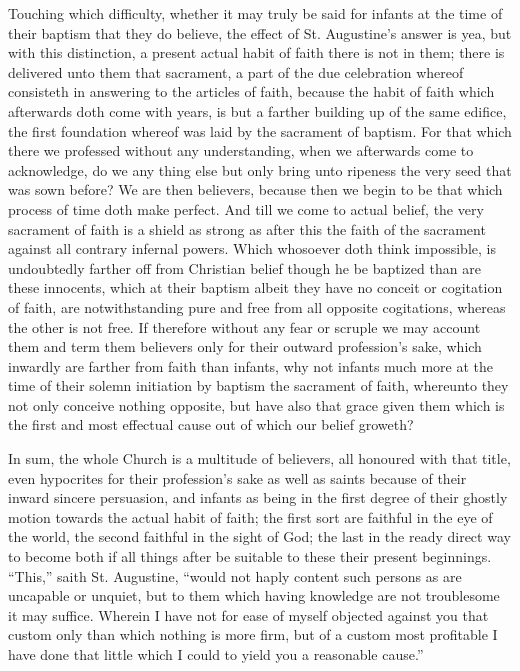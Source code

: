 Touching which difficulty, whether it may truly be said for infants at the time of their baptism that they do believe, the effect of St. Augustine’s answer is yea, but with this distinction, a present actual habit of faith there is not in them;  there is delivered unto them that sacrament, a part of the due celebration whereof consisteth in answering to the articles of faith, because the habit of faith which afterwards doth come with years, is but a farther building up of the same edifice, the first foundation whereof was laid by the sacrament of baptism. For that which there we professed without any understanding, when we afterwards come to acknowledge, do we any thing else but only bring unto ripeness the very seed that was sown before? We are then believers, because then we begin to be that which process of time doth make perfect. And till we come to actual belief, the very sacrament of faith is a shield as strong as after this the faith of the sacrament against all contrary infernal powers. Which whosoever doth think impossible, is undoubtedly farther off from Christian belief though he be baptized than are these innocents, which at their baptism albeit they have no conceit or cogitation of faith, are notwithstanding pure and free from all opposite cogitations, whereas the other is not free. If therefore without any fear or scruple we may account them and term them believers only for their outward profession’s sake, which inwardly are farther from faith than infants, why not infants much more at the time of their solemn initiation by baptism the sacrament of faith, whereunto they not only conceive nothing opposite, but have also that grace given them  which is the first and most effectual cause out of which our belief groweth?

In sum, the whole Church is a multitude of believers, all honoured with that title, even hypocrites for their profession’s sake as well as saints because of their inward sincere persuasion, and infants as being in the first degree of their ghostly motion towards the actual habit of faith; the first sort are faithful in the eye of the world, the second faithful in the sight of God; the last in the ready direct way to become both if all things after be suitable to these their present beginnings. “This,” saith St. Augustine, “would not haply content such persons as are uncapable or unquiet, but to them which having knowledge are not troublesome it may suffice. Wherein I have not for ease of myself objected against you that custom only than which nothing is more firm, but of a custom most profitable I have done that little which I could to yield you a reasonable cause.”

